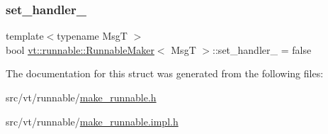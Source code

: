 \mbox{\label{structvt_1_1runnable_1_1_runnable_maker_a52fd27acc3c3259743fdd7aed09d690d}} 
\subsubsection{\texorpdfstring{set\+\_\+handler\+\_\+}{set\_handler\_}}
{\footnotesize\ttfamily template$<$typename MsgT $>$ \\
bool \hyperlink{structvt_1_1runnable_1_1_runnable_maker}{vt\+::runnable\+::\+Runnable\+Maker}$<$ MsgT $>$\+::set\+\_\+handler\+\_\+ = false\hspace{0.3cm}{\ttfamily [private]}}



The documentation for this struct was generated from the following files\+:\begin{DoxyCompactItemize}
\item 
src/vt/runnable/\hyperlink{make__runnable_8h}{make\+\_\+runnable.\+h}\item 
src/vt/runnable/\hyperlink{make__runnable_8impl_8h}{make\+\_\+runnable.\+impl.\+h}\end{DoxyCompactItemize}
